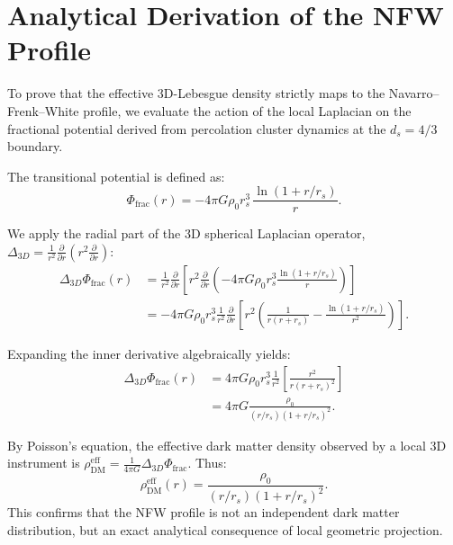 \documentclass[12pt, a4paper]{article}
\begin{document}
\section{Analytical Derivation of the NFW Profile}
\label{app:nfw}

To prove that the effective 3D-Lebesgue density strictly maps to the Navarro--Frenk--White profile, we evaluate the action of the local Laplacian on the fractional potential derived from percolation cluster dynamics at the $d_s = 4/3$ boundary.

The transitional potential is defined as:
\begin{equation}
  \Phi_{\text{frac}}(r) = -4\pi G \rho_0 r_s^3 \, \frac{\ln(1 + r/r_s)}{r}.
\end{equation}

We apply the radial part of the 3D spherical Laplacian operator, $\Delta_{3D} = \frac{1}{r^2} \frac{\partial}{\partial r} \left( r^2 \frac{\partial}{\partial r} \right)$:
\begin{align}
  \Delta_{3D} \Phi_{\text{frac}}(r) &= \frac{1}{r^2} \frac{\partial}{\partial r} \left[ r^2 \frac{\partial}{\partial r} \left( -4\pi G \rho_0 r_s^3 \frac{\ln(1 + r/r_s)}{r} \right) \right] \nonumber \\
  &= -4\pi G \rho_0 r_s^3 \frac{1}{r^2} \frac{\partial}{\partial r} \left[ r^2 \left( \frac{1}{r(r+r_s)} - \frac{\ln(1+r/r_s)}{r^2} \right) \right].
\end{align}

Expanding the inner derivative algebraically yields:
\begin{align}
  \Delta_{3D} \Phi_{\text{frac}}(r) &= 4\pi G \rho_0 r_s^3 \frac{1}{r^2} \left[ \frac{r^2}{r(r+r_s)^2} \right] \nonumber \\
  &= 4\pi G \frac{\rho_0}{(r/r_s)(1 + r/r_s)^2}.
\end{align}

By Poisson's equation, the effective dark matter density observed by a local 3D instrument is $\rho_{\text{DM}}^{\text{eff}} = \frac{1}{4\pi G} \Delta_{3D} \Phi_{\text{frac}}$. Thus:
\begin{equation}
  \rho_{\text{DM}}^{\text{eff}}(r) = \frac{\rho_0}{(r/r_s)(1 + r/r_s)^2}.
\end{equation}
This confirms that the NFW profile is not an independent dark matter distribution, but an exact analytical consequence of local geometric projection.
\end{document}
